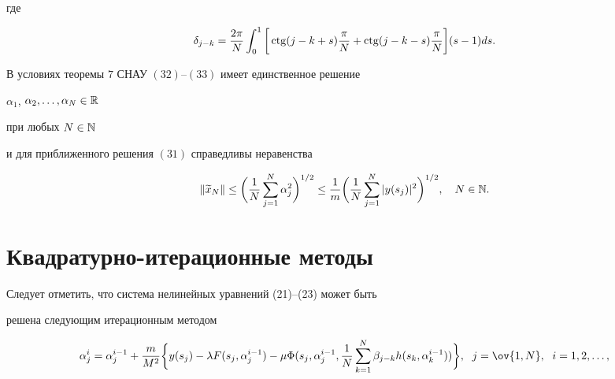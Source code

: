 где


\begin{equation}


\delta_{j-k}=\frac{2\pi}{N}\int_0^1


\bigg[\ctg (j-k+s)\frac{\pi}{N}


+ \ctg (j-k-s)\frac{\pi}{N}\bigg] (s-1) ds.


\end{equation}





\begin{thm}


В условиях теоремы $7$ СНАУ $(32)$--$(33)$ имеет единственное решение


$\alpha_1$, $\alpha_2,\dotsc,\alpha_N\in \Bbb R$




при любых $N\in \Bbb N$


и для приближенного решения $(31)$ справедливы неравенства


$$


\|\widetilde{x}_N\|\leq \bigg( \frac{1}{N}\sum_{j=1}^N\alpha_j^2


\bigg)^{1/2}\leq \frac{1}{m}\bigg( \frac{1}{N}\sum_{j=1}^N


|y(s_j)|^2\bigg)^{1/2},\quad N\in \Bbb N .


$$


\end{thm}





\section{Квадратурно-итерационные методы}





Следует отметить, что система нелинейных уравнений (21)--(23) может быть


решена следующим итерационным методом


\begin{equation}


\alpha_j^i=\alpha_j^{i-1}+\frac{m}{M^2}\biggl\{ y(s_j)-\lambda F(s_j,


\alpha_j^{i-1})-


\mu \Phi(s_j,\alpha_j^{i-1},\frac{1}{N}\sum_{k=1}^N


\beta_{j-k}h(s_k,\alpha_k^{i-1}))\biggr\},\ \; j=\ov{1,N},\ \;


i=1,2,\dotsc,


\end{equation}


